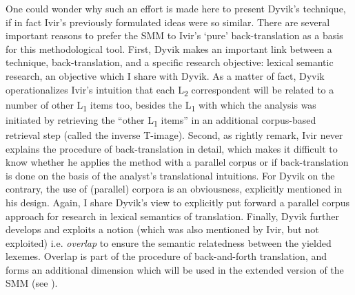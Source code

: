 One could wonder why such an effort is made here to present Dyvik’s technique, if in fact Ivir’s previously formulated ideas were so similar. There are several important reasons to prefer the SMM to Ivir’s ‘pure’ back-translation as a basis for this methodological tool. First, Dyvik makes an important link between a technique, back-translation, and a specific research objective: lexical semantic research, an objective which I share with Dyvik. As a matter of fact, Dyvik operationalizes Ivir’s intuition that each L\textsubscript{2} correspondent will be related to a number of other L\textsubscript{1} items too, besides the L\textsubscript{1} with which the analysis was initiated \citep[478]{dirven_functionalism_1987} by retrieving the “other L\textsubscript{1} items” in an additional corpus-based retrieval step (called the inverse T-image). Second, as \citet[25]{ebeling_patterns_2013} rightly remark, Ivir never explains the procedure of back-translation in detail, which makes it difficult to know whether he applies the method with a parallel corpus or if back-translation is done on the basis of the analyst’s translational intuitions. For Dyvik on the contrary, the use of (parallel) corpora is an obviousness, explicitly mentioned in his design. Again, I share Dyvik’s view to explicitly put forward a parallel corpus approach for research in lexical semantics of translation. Finally, Dyvik further develops and exploits a notion (which was also mentioned by Ivir, but not exploited) i.e. \textit{overlap} to ensure the semantic relatedness between the yielded lexemes. Overlap is part of the procedure of back-and-forth translation, and forms an additional dimension which will be used in the extended version of the SMM (see ).


